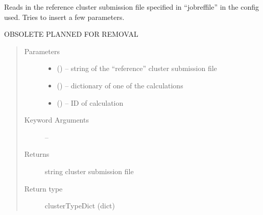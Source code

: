 \documentclass[letterpaper,10pt,english]{sphinxmanual}
\begin{document}
\begin{fulllineitems}
\label{\detokenize{run:run.generateSubRef}}
Reads in the reference cluster submission file specified in ``jobreffile''
in the config used. Tries to insert a few parameters.

OBSOLETE PLANNED FOR REMOVAL
\begin{quote}\begin{description}
\item[{Parameters}] \leavevmode\begin{itemize}
\item {} 
 () -- string of the ``reference'' cluster submission file

\item {} 
 () -- dictionary of one of the calculations

\item {} 
 () -- ID of calculation

\end{itemize}

\item[{Keyword Arguments}] \leavevmode
{} -- 

\item[{Returns}] \leavevmode
string cluster submission file

\item[{Return type}] \leavevmode
clusterTypeDict (dict)

\end{description}\end{quote}

\end{fulllineitems}

\end{document}
